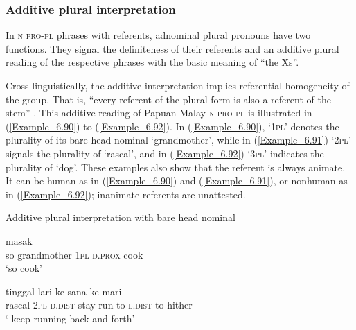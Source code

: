 \subsubsection[Additive plural interpretation]{Additive plural interpretation}
\label{Para_6.2.2.1}
In \textsc{n} \textsc{pro-pl}  phrases with  referents, adnominal plural pronouns have two functions. They signal the definiteness of their referents and an additive plural reading of the respective  phrases with the basic meaning of ``the Xs''.



Cross-linguistically, the additive interpretation implies referential homogeneity of the group. That is, “every referent of the plural form is also a referent of the stem” \citep[1]{Daniel.2013}. This additive reading of Papuan Malay \textsc{n} \textsc{pro-pl} is illustrated in (\ref{Example_6.90}) to (\ref{Example_6.92}). In (\ref{Example_6.90}),  ‘\textsc{1pl}’ denotes the plurality of its bare head nominal  ‘grandmother’, while in (\ref{Example_6.91})  ‘\textsc{2pl}’ signals the plurality of  ‘rascal’, and in (\ref{Example_6.92})  ‘\textsc{3pl}’ indicates the plurality of  ‘dog’. These examples also show that the referent is always animate. It can be human as in (\ref{Example_6.90}) and (\ref{Example_6.91}), or nonhuman as in (\ref{Example_6.92}); inanimate referents are unattested.



\begin{styleExampleTitle}
Additive plural interpretation with bare head nominal
\end{styleExampleTitle}

\ea
\label{Example_6.90}
 {} {} {} {masak}\\ %
 so  grandmother  \textsc{1pl}  \textsc{d.prox}  cook\\

\glt
‘so  cook’ \textstyleExampleSource{[080924-001-Pr.0008]}
\z

\ea
\label{Example_6.91}
 {} {} {tinggal} {lari} {ke} {sana} {ke} {mari}\\ %
 rascal  \textsc{2pl}  \textsc{d.dist}  stay  run  to  \textsc{l.dist}  to  hither\\

\glt
‘ keep running back and forth’ \textstyleExampleSource{[080923-012-CvNP.0011]}
\z

